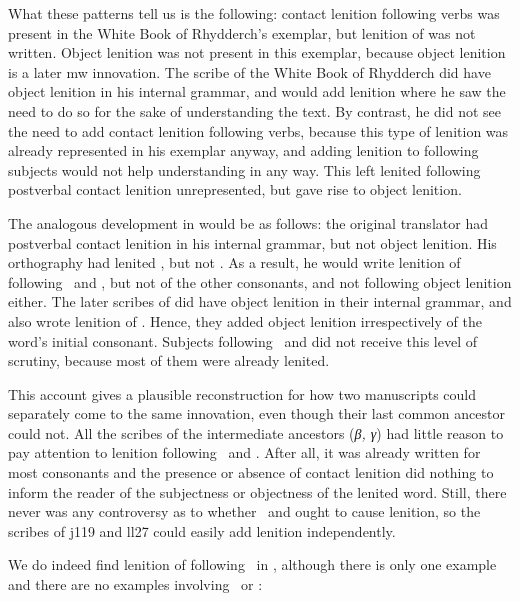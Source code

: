 What these patterns tell us is the following: contact lenition following verbs was present in the White Book of Rhydderch's exemplar, but lenition of  was not written. Object lenition was not present in this exemplar, because object lenition is a later \gls{mw} innovation. The scribe of the White Book of Rhydderch did have object lenition in his internal grammar, and would add lenition where he saw the need to do so for the sake of understanding the text. By contrast, he did not see the need to add contact lenition following verbs, because this type of lenition was already represented in his exemplar anyway, and adding lenition to following subjects would not help understanding in any way. This left lenited  following postverbal contact lenition unrepresented, but gave rise to object lenition.

The analogous development in  would be as follows: the original translator had postverbal contact lenition in his internal grammar, but not object lenition. His orthography had lenited , but not . As a result, he would write lenition of  following \ei\ and , but not of the other consonants, and not following object lenition either. The later scribes of  did have object lenition in their internal grammar, and also wrote lenition of . Hence, they added object lenition irrespectively of the word's initial consonant. Subjects following \ei\ and  did not receive this level of scrutiny, because most of them were already lenited.

This account gives a plausible reconstruction for how two manuscripts could separately come to the same innovation, even though their last common ancestor could not. All the scribes of the intermediate ancestors (\textit{β, γ}) had little reason to pay attention to lenition following \ei\ and . After all, it was already written for most consonants and the presence or absence of contact lenition did nothing to inform the reader of the subjectness or objectness of the lenited word. Still, there never was any controversy as to whether \ei\ and  ought to cause lenition, so the scribes of \gls{j119} and \gls{ll27} could easily add lenition independently.

We do indeed find lenition of  following \ei\ in , although there is only one example and there are no examples involving \oes\ or :

\begin{mwl}
\end{mwl}


